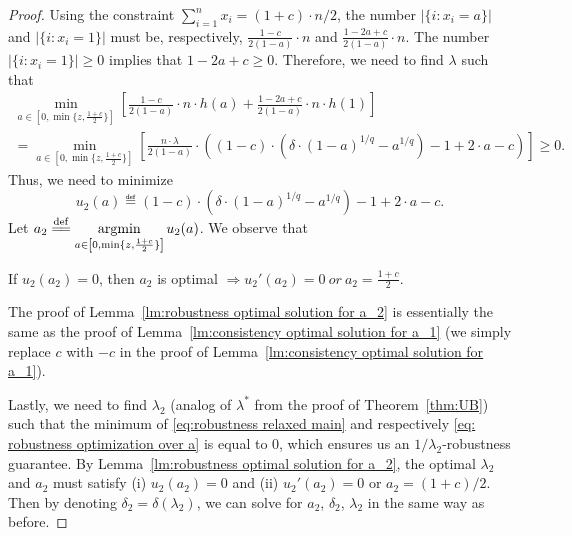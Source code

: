 \begin{proof}
Using the constraint $\sum_{i=1}^n x_i = (1+c)\cdot n/2$, the number $|\{i: x_i=a\}|$ and $|\{i: x_i=1\}|$ must be, respectively, $\frac{1-c}{2(1-a)}\cdot n$ and $\frac{1-2a+c}{2(1-a)}\cdot n$. The number $|\{i: x_i=1\}|\geq 0$ implies that $1-2a+c\geq 0$. Therefore, we need to find $\lambda$ such that
\begin{multline}
    \label{eq: robustness optimization over a}   \min_{a\in\left[0,\min\{z,\frac{1+c}{2}\}\right]}\left[\frac{1-c}{2(1-a)}\cdot n\cdot h(a) + \frac{1-2a+c}{2(1-a)}\cdot n\cdot h(1)\right]\\
    =\min_{a\in\left[0,\min\{z,\frac{1+c}{2}\}\right]}\left[\frac{n\cdot\lambda}{2(1-a)}\cdot\left((1-c)\cdot\left(\delta\cdot(1-a)^{1/q}-a^{1/q}\right)-1+2\cdot a-c\right)\right]\ge 0.
\end{multline}
Thus, we need to minimize $$u_2(a)\eqdef(1-c)\cdot\left(\delta\cdot(1-a)^{1/q}-a^{1/q}\right)-1+2\cdot a-c.$$
Let $a_2\overset{\mathrm{def}}{=\mathrel{\mkern-3mu}=} \mathop{\rm argmin}\limits_{a\in\left[0,\min\{z,\frac{1+c}{2}\}\right]} u_2(a)$. We observe that
\begin{lemma}
    \label{lm:robustness optimal solution for a_2}
    If $u_2(a_2)=0$, then $a_2$ is optimal $\Rightarrow u_2'(a_2)=0\ or\ a_2=\frac{1+c}{2}$.
\end{lemma}
The proof of Lemma~\ref{lm:robustness optimal solution for a_2} is essentially the same as the proof of Lemma~\ref{lm:consistency optimal solution for a_1} (we simply replace $c$ with $-c$ in the proof of Lemma~\ref{lm:consistency optimal solution for a_1}).

Lastly, we need to find $\lambda_2$ (analog of $\lambda^*$ from the proof of Theorem~\ref{thm:UB}) such that the minimum of \eqref{eq:robustness relaxed main} and respectively \eqref{eq: robustness optimization over a} is equal to $0$, which ensures us an $1/\lambda_2$-robustness guarantee. By Lemma~\ref{lm:robustness optimal solution for a_2}, the optimal $\lambda_2$ and $a_2$ must satisfy (i) $u_2(a_2)=0$ and (ii) $u_2'(a_2)=0$ or $a_2=(1+c)/2$. Then by denoting $\delta_2=\delta(\lambda_2)$, we can solve for $a_2$, $\delta_2$, $\lambda_2$ in the same way as before.


\end{proof}
